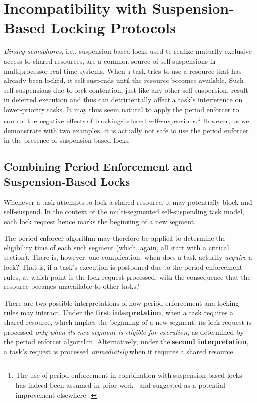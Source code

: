 \section{Incompatibility with Suspension-Based Locking Protocols}
\label{sec:locking}

\emph{Binary semaphores}, i.e., suspension-based locks used to realize mutually exclusive access to shared resources, are a common source of self-suspensions in multiprocessor real-time systems. When a task tries to use a resource that has already been locked, it self-suspends until the resource becomes available. Such self-suspensions due to lock contention, just like any other self-suspension, result in deferred execution and thus can detrimentally affect a task's interference on lower-priority tasks. It may thus seem natural to apply the period enforcer  to control the negative effects of blocking-induced self-suspensions.\footnote{The use of  period enforcement in combination with suspension-based locks has indeed been assumed in prior work~\cite{Raj:91} and suggested as a potential improvement elsewhere~\cite{Lak:11,LNR:09}.} However, as we demonstrate with two examples, it is actually not safe to use the period enforcer in the presence of suspension-based locks.

\subsection{Combining Period Enforcement and Suspension-Based Locks}

Whenever a task attempts to lock a shared resource, it may potentially block and self-suspend. In the context of the multi-segmented self-suspending task model, each lock request hence marks the beginning of a new segment.

The period enforcer algorithm may therefore be applied to determine the eligibility time of each such segment (which, again, all start with a critical section). There is, however, one complication: when does a task actually \emph{acquire} a lock? That is, if a task's execution is postponed due to the period enforcement rules, at which point is the lock request processed, with the consequence that the resource becomes unavailable to other tasks? 

There are two possible interpretations of how period enforcement and locking rules may interact. Under the \textbf{first interpretation}, when a task requires a shared resource, which implies the beginning of a new segment, its lock request is processed \emph{only when its new segment is eligible for execution}, as determined by the period enforcer algorithm. Alternatively, under the \textbf{second interpretation}, a task's request is processed \emph{immediately} when it requires a shared resource.

